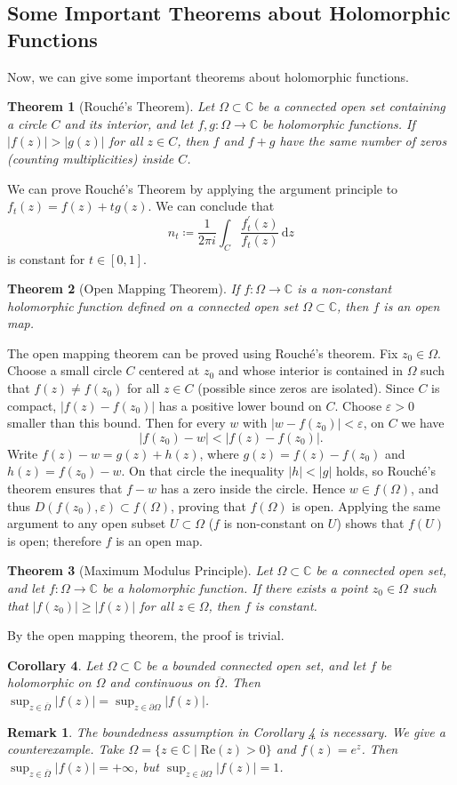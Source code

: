 \documentclass{article}
\newtheorem{theorem}{Theorem}[section]
\newtheorem{corollary}[theorem]{Corollary}
\newtheorem*{remark}{Remark}
\theoremstyle{definition}
\newcommand{\C}{\mathbb{C}}
\newcommand{\dd}{\mathrm{d}}
\newcommand{\re}{\mathrm{Re}}
\renewcommand{\geq}{\geqslant}
\begin{document}
\subsection{Some Important Theorems about Holomorphic Functions}
Now, we can give some important theorems about holomorphic functions.
\begin{theorem}[Rouché's Theorem]
    Let \(\Omega\subset\C\) be a connected open set containing a circle $C$ and its interior, and let \(f,g\colon\Omega\to\C\) be holomorphic functions. If \(|f(z)| > |g(z)|\) for all \(z\in C\), then \(f\) and \(f+g\) have the same number of zeros (counting multiplicities) inside \(C\).
\end{theorem}
We can prove Rouché's Theorem by applying the argument principle to $f_t(z)=f(z)+tg(z)$. We can conclude that
\[n_t\coloneq\frac{1}{2\pi i}\int_C\frac{f_t^{\prime}(z)}{f_t(z)}\,\dd z\]
is constant for $t\in [0,1]$.
\begin{theorem}[Open Mapping Theorem]
    If \(f\colon\Omega\to\C\) is a non-constant holomorphic function defined on a connected open set \(\Omega\subset\C\), then \(f\) is an open map.
\end{theorem}
The open mapping theorem can be proved using Rouché's theorem. Fix \(z_0\in\Omega\). Choose a small circle \(C\) centered at \(z_0\) and whose interior is contained in \(\Omega\) such that \(f(z)\neq f(z_0)\) for all \(z\in C\) (possible since zeros are isolated). Since \(C\) is compact, \(|f(z)-f(z_0)|\) has a positive lower bound on \(C\). Choose \(\varepsilon>0\) smaller than this bound. Then for every \(w\) with \(|w-f(z_0)|<\varepsilon\), on \(C\) we have
    \[
    |f(z_0)-w| < |f(z)-f(z_0)|.
    \]
    Write \(f(z)-w = g(z)+h(z)\), where \(g(z)=f(z)-f(z_0)\) and \(h(z)=f(z_0)-w\). 
    On that circle the inequality \(|h|<|g|\) holds, so Rouch\'e's theorem ensures that \(f-w\) has a zero inside the circle. 
    Hence \(w\in f(\Omega)\), and thus \(D(f(z_0),\varepsilon)\subset f(\Omega)\), proving that \(f(\Omega)\) is open. Applying the same argument to any open subset \(U\subset\Omega\) (\(f\) is non-constant on $U$) shows that \(f(U)\) is open; therefore \(f\) is an open map.
\begin{theorem}[Maximum Modulus Principle]
Let \(\Omega\subset\C\) be a connected open set, and let \(f\colon\Omega\to\C\) be a holomorphic function. If there exists a point \(z_0\in\Omega\) such that \(|f(z_0)| \geq |f(z)|\) for all \(z\in\Omega\), then \(f\) is constant.
\end{theorem}
By the open mapping theorem, the proof is trivial.
\begin{corollary}\label{cor:maximum modulus}
Let \(\Omega\subset\C\) be a bounded connected open set, and let \(f\) be holomorphic on $\Omega$ and continuous on $\overline{\Omega}$. Then $\sup_{z\in\overline{\Omega}} |f(z)| = \sup_{z\in\partial \Omega} |f(z)|$.
\end{corollary}
\begin{remark}
    The boundedness assumption in Corollary \ref{cor:maximum modulus} is necessary. We give a counterexample. Take $\Omega=\{z\in\C\mid \re(z)>0\}$ and $f(z)=e^z$. Then $\sup_{z\in\overline{\Omega}} |f(z)|=+\infty$, but $\sup_{z\in\partial \Omega} |f(z)| = 1$.
\end{remark}
\end{document}
